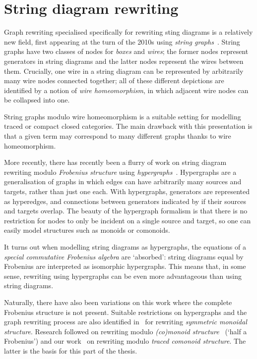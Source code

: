 \section{String diagram rewriting}

Graph rewriting specialised specifically for rewriting sting diagrams is a
relatively new field, first appearing at the turn of the 2010s using
\emph{string graphs}~\cite{%
    dixon2010open,dixon2013opengraphs,kissinger2012pictures%
}.
String graphs have two classes of nodes for \emph{boxes} and \emph{wires}; the
former nodes represent generators in string diagrams and the latter nodes
represent the wires between them.
Crucially, one wire in a string diagram can be represented by arbitrarily
many wire nodes connected together; all of these different depictions are
identified by a notion of \emph{wire homeomorphism}, in which adjacent wire
nodes can be collapsed into one.

\begin{center}
\end{center}

String graphs modulo wire homeomorphism is a suitable setting for modelling
traced or compact closed categories.
The main drawback with this presentation is that a given term may correspond to
many different graphs thanks to wire homeomorphism.

More recently, there has recently been a flurry of work on string
diagram rewriting modulo \emph{Frobenius structure} using
\emph{hypergraphs}~\cite{%
    bonchi2016rewriting,zanasi2017rewriting,bonchi2017confluence,%
    bonchi2018rewriting,bonchi2022string,bonchi2022stringa,bonchi2022stringb%
}.
Hypergraphs are a generalisation of graphs in which edges can have arbitrarily
many sources and targets, rather than just one each.
With hypergraphs, generators are represented as hyperedges, and connections
between generators indicated by if their sources and targets overlap.
The beauty of the hypergraph formalism is that there is no restriction for
nodes to only be incident on a single source and target, so one can easily
model structures such as monoids or comonoids.

\begin{center}
\end{center}

It turns out when modelling string diagrams as hypergraphs, the equations of
a \emph{special commutative Frobenius algebra} are `absorbed': string diagrams
equal by Frobenius are interpreted as isomorphic hypergraphs.
This means that, in some sense, rewriting using hypergraphs can be even more
advantageous than using string diagrams.

Naturally, there have also been variations on this work where the complete
Frobenius structure is not present.
Suitable restrictions on hypergraphs and the graph rewriting process are also
identified in~\cite{bonchi2016rewriting} for rewriting
\emph{symmetric monoidal structure}.
Research followed on rewriting modulo
\emph{(co)monoid structure}~\cite{milosavljevic2023string} (`half a Frobenius')
and our work~\cite{ghica2023rewriting} on rewriting modulo
\emph{traced comonoid structure}.
The latter is the basis for this part of the thesis.